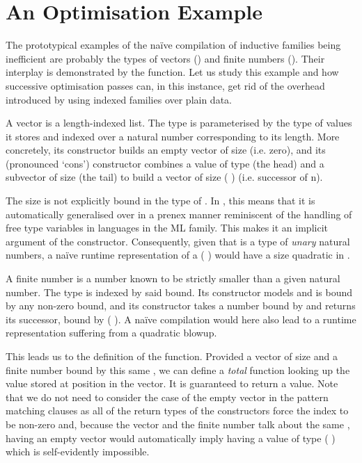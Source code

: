 
\section{An Optimisation Example}\label{sec:optimisation-example}

The prototypical examples of the naïve compilation of inductive families being
inefficient are probably the types of vectors ()
and finite numbers ().
%
Their interplay is demonstrated by the  function.
Let us study this example and how successive optimisation passes can, in this
instance, get rid of the overhead introduced by using indexed families over
plain data.

A vector is a length-indexed list.
%
The type  is parameterised by the type of values it stores
and indexed over a natural number corresponding to its length.
%
More concretely, its  constructor builds an empty vector of size
 (i.e. zero),
%
and its \IdrisData{(::)} (pronounced `cons') constructor combines a
value of type  (the head) and a subvector of size 
(the tail) to build a vector of size ( )
(i.e. successor of n).


The size  is not explicitly bound in the type of \IdrisData{(::)}.
In \idris{}, this means that it is automatically generalised over in a prenex
manner reminiscent of the handling of free type variables in languages in the
ML family.
%
This makes it an implicit argument of the constructor. Consequently, given that
 is a type of \emph{unary} natural numbers, a naïve runtime
representation of a {(  )} would
have a size quadratic in .

A finite number is a number known to be strictly smaller than a given natural
number. The type  is indexed by said bound.
%
Its  constructor models  and is bound by any
non-zero bound, and its  constructor takes a number bound by
 and returns its successor, bound by
( \IdrisFunction{+} ).
%
A naïve compilation would here also lead to a runtime representation suffering
from a quadratic blowup.


This leads us to the definition of the  function.
%
Provided a vector of size  and a finite number  bound
by this same , we can define a \emph{total} function looking up the
value stored at position  in the vector.
%
It is guaranteed to return a value.
%
Note that we do not need to consider the case of the empty vector in the pattern
matching clauses as all of the return types of the  constructors force
the index to be non-zero and, because the vector and the finite number talk about the
same , having an empty vector would automatically imply having a value
of type ( ) which is self-evidently impossible.

